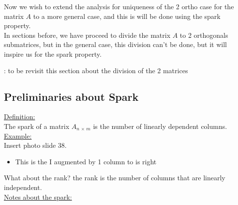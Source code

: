 \documentclass[12pt,a4paper]{book}
\begin{document}
Now we wish to extend the analysis for uniqueness of the 2 ortho case for the matrix $A$ to a more general case, and this is will be done using the spark property.\\

In sections before, we have proceed to divide the matrix $A$ to 2 orthogonals submatrices, but in the general case, this division can't be done, but it will inspire us for the spark property.

: to be revisit this section about the division of the 2 matrices

\subsection{Preliminaries about Spark}

\underline{Definition:}\\

The spark of a matrix $A_{n \, \times \, m}$ is the  number of linearly dependent columns.\\


\underline{Example:}\\ 

Insert photo slide 38.


\begin{itemize}
    \item This is the I augmented by 1 column to is right
\end{itemize}


What about the rank? the rank is the  number of columns that are linearly independent.\\


\underline{Notes about the spark:}
\end{document}
